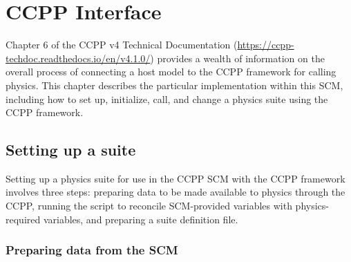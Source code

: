 \chapter{CCPP Interface}
\label{chapter: ccpp_interface}

Chapter 6 of the CCPP v4 Technical Documentation (\url{https://ccpp-techdoc.readthedocs.io/en/v4.1.0/}) provides a wealth of information on the overall process of connecting a host model to the CCPP framework for calling physics. This chapter describes the particular implementation within this SCM, including how to set up, initialize, call, and change a physics suite using the CCPP framework.

\section{Setting up a suite}

Setting up a physics suite for use in the CCPP SCM with the CCPP framework involves three steps: preparing data to be made available to physics through the CCPP, running the  script to reconcile SCM-provided variables with physics-required variables, and preparing a suite definition file.

\subsection{Preparing data from the SCM}

